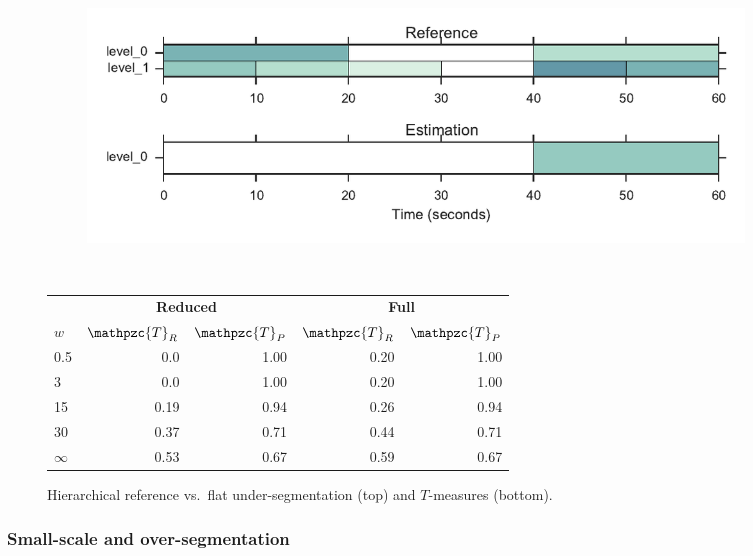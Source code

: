 \documentclass{article}
\def\shag{\ensuremath{\mathpzc{T}}}
\begin{document}
\begin{figure}
  \centering
  \begin{subfigure}{0.5\textwidth}
    \centering
    \includegraphics[width=0.94\textwidth]{figs/hier-flatlarger.pdf}
  \end{subfigure}%
  \\
  \begin{minipage}{0.5\textwidth}
    \small
    \centering
    \vspace{10pt}
    \begin{tabular}{l|rr|rr}
      & \multicolumn{2}{c|}{\textbf{Reduced}} & \multicolumn{2}{c}{\textbf{Full}} \\
      $w$       & $\shag_R$    & $\shag_P$  & $\shag_R$ & $\shag_P$    \\
      \hline
      0.5       & 0.0      & 1.00   & 0.20 & 1.00   \\     
      3         & 0.0      & 1.00   & 0.20 & 1.00   \\
      15        & 0.19     & 0.94   & 0.26 & 0.94 \\
      30        & 0.37     & 0.71   & 0.44 & 0.71 \\
      $\infty$  & 0.53     & 0.67     & 0.59 & 0.67\\
    \end{tabular}
  \end{minipage}
  \caption{Hierarchical reference vs.\ flat under-segmentation (top) and $T$-measures
  (bottom).}
  \label{fig:hier-flatlarger}
\end{figure}


\subsubsection{Small-scale and over-segmentation}
\end{document}
